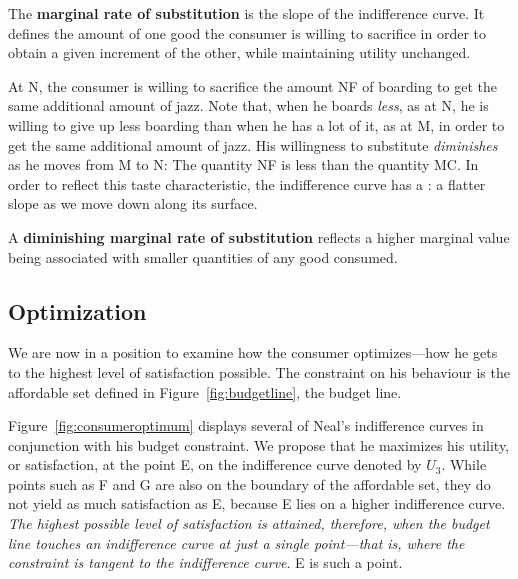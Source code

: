 \begin{DefBox}
The \textbf{marginal rate of substitution} is the slope of the indifference curve. It defines the amount of one good the consumer is willing to sacrifice in order to obtain a given increment of the other, while maintaining utility unchanged.
\end{DefBox}

At N, the consumer is willing to sacrifice the amount NF of boarding to get the same additional amount of jazz. Note that, when he boards \textit{less}, as at N, he is willing to give up less boarding than when he has a lot of it, as at M, in order to get the same additional amount of jazz. His willingness to substitute \textit{diminishes} as he moves from M to N: The quantity NF is less than the quantity MC. In order to reflect this taste characteristic, the indifference curve has a : a flatter slope as we move down along its surface.

\begin{DefBox}
A \textbf{diminishing marginal rate of substitution} reflects a higher marginal value being associated with smaller quantities of any good consumed.
\end{DefBox}

\subsection*{Optimization}

We are now in a position to examine how the consumer optimizes---how he gets to the highest level of satisfaction possible. The constraint on his behaviour is the affordable set defined in Figure~\ref{fig:budgetline}, the budget line.

Figure~\ref{fig:consumeroptimum} displays several of Neal's indifference curves in conjunction with his budget constraint. We propose that he maximizes his utility, or satisfaction, at the point E, on the indifference curve denoted by $U_3$. While points such as F and G are also on the boundary of the affordable set, they do not yield as much satisfaction as E, because E lies on a higher indifference curve. \textit{The highest possible level of satisfaction is attained, therefore, when the budget line touches an indifference curve at just a single point---that is, where the constraint is tangent to the indifference curve}. E is such a point.



